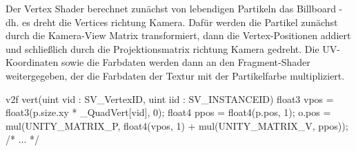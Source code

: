 Der Vertex Shader berechnet zunächst von lebendigen Partikeln das Billboard - dh. es dreht die Vertices richtung Kamera. Dafür werden die Partikel zunächst durch die Kamera-View Matrix transformiert, dann die Vertex-Positionen addiert und schlie{\ss}lich durch die Projektionsmatrix richtung Kamera gedreht. Die UV-Koordinaten sowie die Farbdaten werden dann an den Fragment-Shader weitergegeben, der die Farbdaten der Textur mit der Partikelfarbe multipliziert.

\begin{hlsl}[caption=Unlit Billboard Vertex Shader]
v2f vert(uint vid : SV_VertexID, uint iid : SV_INSTANCEID)
{
    float3 vpos = float3(p.size.xy * _QuadVert[vid], 0);
    float4 ppos = float4(p.pos, 1);
    o.pos = mul(UNITY_MATRIX_P, float4(vpos, 1) + mul(UNITY_MATRIX_V, ppos));
    /* ... */
}
\end{hlsl}

